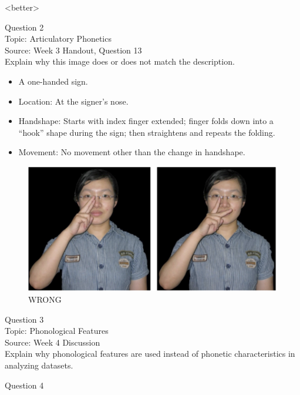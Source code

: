 \documentclass[12pt]{article}
\begin{document}
<better>


\newpage

{\large Question 2}\\

Topic: Articulatory Phonetics\\
Source: Week 3 Handout, Question 13\\

Explain why this image does or does not match the description.\\

\begin{itemize} \item A one-handed sign. \item Location: At the signer’s nose. \item Handshape: Starts with index finger extended; finger folds down into a “hook” shape during the sign; then straightens and repeats the folding. \item Movement: No movement other than the change in handshape. \end{itemize}

\begin{figure}[H]
\includegraphics{../images/taiwansign_wrong.png}
\caption{WRONG}
\end{figure}

\newpage

{\large Question 3}\\

Topic: Phonological Features\\
Source: Week 4 Discussion\\

Explain why phonological features are used instead of phonetic characteristics in analyzing datasets.\\


\newpage

{\large Question 4}\\
\end{document}
